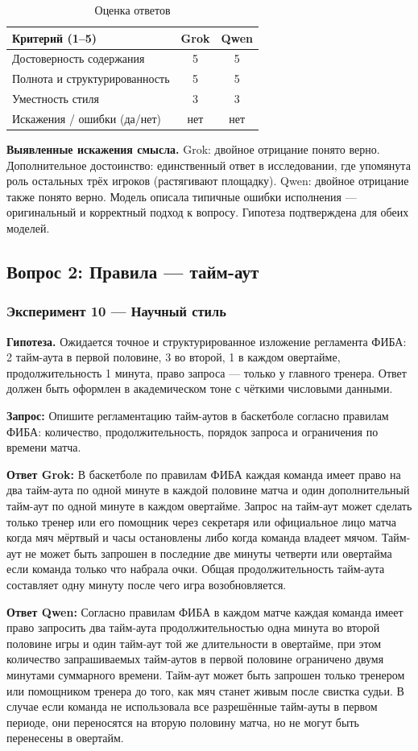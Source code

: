\documentclass[a4paper, final]{article}
\newcommand{\scoretablefilled}[8]{%
    \vspace{4pt}
    \begin{table}[h!]
    \centering
    \small
    \begin{tabular}{|l|c|c|}
    \hline
    \textbf{Критерий (1--5)} & \textbf{Grok} & \textbf{Qwen} \\
    \hline
    Достоверность содержания & #1 & #2 \\
    \hline
    Полнота и структурированность & #3 & #4 \\
    \hline
    Уместность стиля & #5 & #6 \\
    \hline
    Искажения / ошибки (да/нет) & #7 & #8 \\
    \hline
    \end{tabular}
    \caption{Оценка ответов}
    \end{table}
    \vspace{2pt}
}
\begin{document}
\scoretablefilled{5}{5}{5}{5}{3}{3}{нет}{нет}

\noindent\textbf{Выявленные искажения смысла.} Grok: двойное отрицание понято верно. Дополнительное достоинство: единственный ответ в исследовании, где упомянута роль остальных трёх игроков (растягивают площадку). Qwen: двойное отрицание также понято верно. Модель описала типичные ошибки исполнения — оригинальный и корректный подход к вопросу. Гипотеза подтверждена для обеих моделей.

\newpage

\subsection{Вопрос 2: Правила — тайм-аут}

\subsubsection{Эксперимент 10 — Научный стиль}

\noindent\textbf{Гипотеза.} Ожидается точное и структурированное изложение регламента ФИБА: 2 тайм-аута в первой половине, 3 во второй, 1 в каждом овертайме, продолжительность 1 минута, право запроса — только у главного тренера. Ответ должен быть оформлен в академическом тоне с чёткими числовыми данными.

\noindent\textbf{Запрос:} Опишите регламентацию тайм-аутов в баскетболе согласно правилам ФИБА: количество, продолжительность, порядок запроса и ограничения по времени матча.

\noindent\textbf{Ответ Grok:} В баскетболе по правилам ФИБА каждая команда имеет право на два тайм-аута по одной минуте в каждой половине матча и один дополнительный тайм-аут по одной минуте в каждом овертайме. Запрос на тайм-аут может сделать только тренер или его помощник через секретаря или официальное лицо матча когда мяч мёртвый и часы остановлены либо когда команда владеет мячом. Тайм-аут не может быть запрошен в последние две минуты четверти или овертайма если команда только что набрала очки. Общая продолжительность тайм-аута составляет одну минуту после чего игра возобновляется.

\noindent\textbf{Ответ Qwen:} Согласно правилам ФИБА в каждом матче каждая команда имеет право запросить два тайм-аута продолжительностью одна минута во второй половине игры и один тайм-аут той же длительности в овертайме, при этом количество запрашиваемых тайм-аутов в первой половине ограничено двумя минутами суммарного времени. Тайм-аут может быть запрошен только тренером или помощником тренера до того, как мяч станет живым после свистка судьи. В случае если команда не использовала все разрешённые тайм-ауты в первом периоде, они переносятся на вторую половину матча, но не могут быть перенесены в овертайм.
\end{document}
